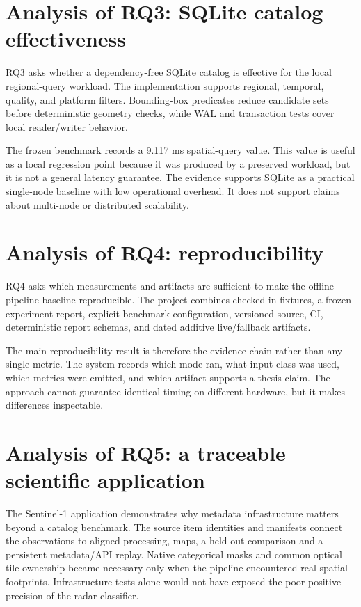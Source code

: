 \section{Analysis of RQ3: SQLite catalog effectiveness}

RQ3 asks whether a dependency-free SQLite catalog is effective for the local regional-query workload. The implementation supports regional, temporal, quality, and platform filters. Bounding-box predicates reduce candidate sets before deterministic geometry checks, while WAL and transaction tests cover local reader/writer behavior.

The frozen benchmark records a 9.117 ms spatial-query value. This value is useful as a local regression point because it was produced by a preserved workload, but it is not a general latency guarantee. The evidence supports SQLite as a practical single-node baseline with low operational overhead. It does not support claims about multi-node or distributed scalability.

\section{Analysis of RQ4: reproducibility}

RQ4 asks which measurements and artifacts are sufficient to make the offline pipeline baseline reproducible. The project combines checked-in fixtures, a frozen experiment report, explicit benchmark configuration, versioned source, CI, deterministic report schemas, and dated additive live/fallback artifacts.

The main reproducibility result is therefore the evidence chain rather than any single metric. The system records which mode ran, what input class was used, which metrics were emitted, and which artifact supports a thesis claim. The approach cannot guarantee identical timing on different hardware, but it makes differences inspectable.

\section{Analysis of RQ5: a traceable scientific application}

The Sentinel-1 application demonstrates why metadata infrastructure matters beyond a
catalog benchmark. The source item identities and manifests connect the observations to
aligned processing, maps, a held-out comparison and a persistent metadata/API replay.
Native categorical masks and common optical tile ownership became necessary only when the
pipeline encountered real spatial footprints. Infrastructure tests alone would not have
exposed the poor positive precision of the radar classifier.

